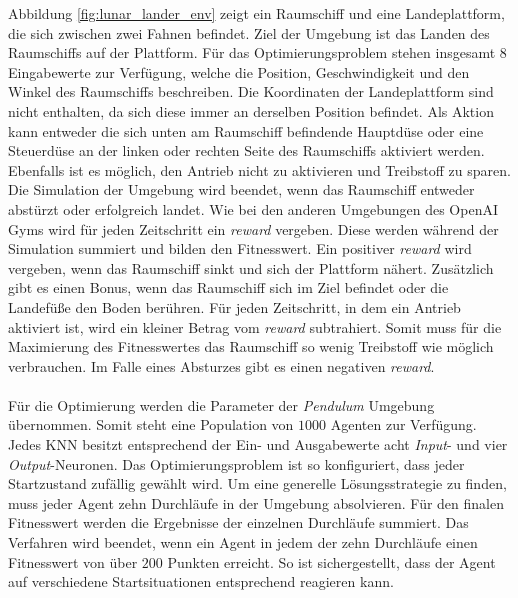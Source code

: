 Abbildung \ref{fig:lunar_lander_env} zeigt ein Raumschiff und eine Landeplattform, die sich zwischen zwei Fahnen befindet. Ziel der Umgebung ist das Landen des Raumschiffs auf der Plattform. Für das Optimierungsproblem stehen insgesamt $8$ Eingabewerte zur Verfügung, welche die Position, Geschwindigkeit und den Winkel des Raumschiffs beschreiben. Die Koordinaten der Landeplattform sind nicht enthalten, da sich diese immer an derselben Position befindet. Als Aktion kann entweder die sich unten am Raumschiff befindende Hauptdüse oder eine Steuerdüse an der linken oder rechten Seite des Raumschiffs aktiviert werden. Ebenfalls ist es möglich, den Antrieb nicht zu aktivieren und Treibstoff zu sparen. Die Simulation der Umgebung wird beendet, wenn das Raumschiff entweder abstürzt oder erfolgreich landet. Wie bei den anderen Umgebungen des OpenAI Gyms wird für jeden Zeitschritt ein \emph{reward} vergeben. Diese werden während der Simulation summiert und bilden den Fitnesswert. Ein positiver \emph{reward} wird vergeben, wenn das Raumschiff sinkt und sich der Plattform nähert. Zusätzlich gibt es einen Bonus, wenn das Raumschiff sich im Ziel befindet oder die Landefüße den Boden berühren. Für jeden Zeitschritt, in dem ein Antrieb aktiviert ist, wird ein kleiner Betrag vom \emph{reward} subtrahiert. Somit muss für die Maximierung des Fitnesswertes das Raumschiff so wenig Treibstoff wie möglich verbrauchen. Im Falle eines Absturzes gibt es einen negativen \emph{reward}.
\\\\
Für die Optimierung werden die Parameter der \emph{Pendulum} Umgebung übernommen. Somit steht eine Population von $1000$ Agenten zur Verfügung. Jedes \ac{KNN} besitzt entsprechend der Ein- und Ausgabewerte acht \emph{Input}- und vier \emph{Output}-Neuronen. Das Optimierungsproblem ist so konfiguriert, dass jeder Startzustand zufällig gewählt wird. Um eine generelle Lösungsstrategie zu finden, muss jeder Agent zehn Durchläufe in der Umgebung absolvieren. Für den finalen Fitnesswert werden die Ergebnisse der einzelnen Durchläufe summiert. Das Verfahren wird beendet, wenn ein Agent in jedem der zehn Durchläufe einen Fitnesswert von über $200$ Punkten erreicht. So ist sichergestellt, dass der Agent auf verschiedene Startsituationen entsprechend reagieren kann.
